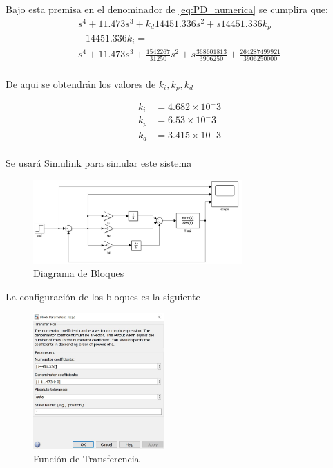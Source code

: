\documentclass[a4paper]{IEEEtran} %
\begin{document}
Bajo esta premisa en el denominador de \ref{eq:PD_numerica} se cumplira que:
\begin{equation}
    \begin{split}
        s^4+11.473s^3+k_{d}14451.336s^2+s14451.336k_{p}\\+14451.336k_{i}=\\s^4+11.473s^3+\frac{1542267}{31250}s^2+s\frac{368601813}{3906250}+\frac{264287499921}{3906250000}\\
    \end{split}
    \label{eq:PD_numerica1}
\end{equation}

De aqui se obtendrán los valores de $k_{i},k_{p},k_{d}$

\begin{equation}
    \begin{split}
        k_{i}&=4.682\times 10^-3\\
        k_{p}&=6.53\times 10^-3\\
        k_{d}&=3.415\times 10^-3\\
    \end{split}
    \label{eq:vieta}
\end{equation}

Se usará Simulink para simular este sistema
\begin{figure}[h]
    \centering
        \includegraphics[width=8cm]{images/8}
        \caption{Diagrama de Bloques}
        \label{fig:simu}
\end{figure}
\vspace{100mm}

La configuración de los bloques es la siguiente

\begin{figure}[h]
    \centering
        \includegraphics[width=5cm]{images/9}
        \caption{Función de Transferencia}
        \label{fig:config1}
\end{figure}
\end{document}

